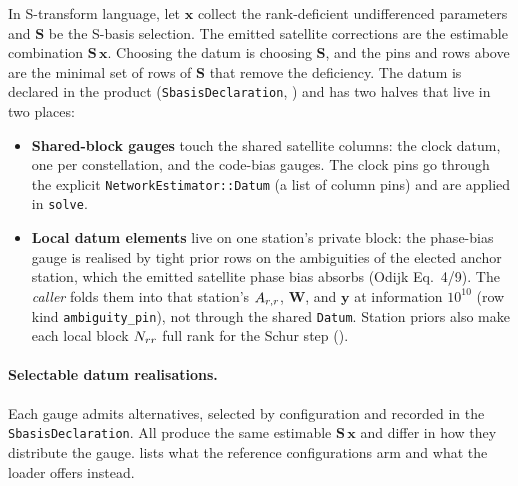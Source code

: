 \documentclass[main.tex]{subfiles}
\begin{document}
In S-transform language, let $\bm{x}$ collect the rank-deficient
undifferenced parameters and $\bm{S}$ be the S-basis selection. The
emitted satellite corrections are the estimable combination
$\bm{S}\,\bm{x}$. Choosing the datum is choosing $\bm{S}$, and the pins
and rows above are the minimal set of rows of $\bm{S}$ that remove the
deficiency. The datum is declared in the product
(\texttt{SbasisDeclaration}, ) and has two
halves that live in two places:

\begin{itemize}[leftmargin=*, itemsep=1pt]
\item \textbf{Shared-block gauges} touch the shared satellite columns:
      the clock datum, one per constellation, and the code-bias gauges.
      The clock pins go through the explicit
      \texttt{NetworkEstimator::Datum} (a list of column pins) and are
      applied in \texttt{solve}.
\item \textbf{Local datum elements} live on one station's private
      block: the phase-bias gauge is realised by tight prior rows on the
      ambiguities of the elected anchor station, which the emitted
      satellite phase bias absorbs (Odijk Eq.~4/9). The \emph{caller}
      folds them into that station's $A_{r,r}$, $\bm{W}$, and
      $\bm{y}$ at information $10^{10}$ (row kind \texttt{ambiguity\_pin}),
      not through the shared \texttt{Datum}. Station priors also make
      each local block $N_{rr}$ full rank for the Schur step
      ().
\end{itemize}

\paragraph{Selectable datum realisations.}
Each gauge admits alternatives, selected by configuration and recorded in
the \texttt{SbasisDeclaration}. All produce the same estimable
$\bm{S}\,\bm{x}$ and differ in how they distribute the gauge.
 lists what the reference configurations arm and what
the loader offers instead.
\end{document}
